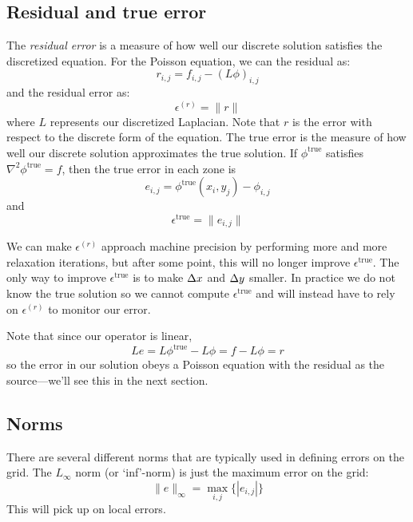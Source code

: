 \subsection{Residual and true error}

The {\em residual error} is a measure of how well our discrete solution
satisfies the discretized equation.  For the Poisson equation, we
can the residual as:
\begin{equation}
r_{i,j} = f_{i,j} - (L \phi)_{i,j} 
\end{equation}
and the residual error as:
\begin{equation}
\epsilon^{(r)} = \| r \|
\end{equation}
where $L$ represents our discretized Laplacian.  Note that $r$ is the
error with respect to the discrete form of the equation.  The true
error is the measure of how well our discrete solution approximates
the true solution.  If $\phi^\mathrm{true}$ satisfies $\nabla^2
\phi^\mathrm{true} = f$, then the true error in each zone is
\begin{equation}
e_{i,j} = \phi^\mathrm{true}(x_i,y_j) - \phi_{i,j} 
\end{equation}
and
\begin{equation}
\epsilon^\mathrm{true} = \| e_{i,j} \|
\end{equation}

We can make $\epsilon^{(r)}$ approach machine precision by performing
more and more relaxation iterations, but after some point, this will
no longer improve $\epsilon^\mathrm{true}$.  The only way to improve
$\epsilon^\mathrm{true}$ is to make $\Delta x$ and $\Delta y$ smaller.
In practice we do not know the true solution so we cannot compute
$\epsilon^\mathrm{true}$ and will instead have to rely on
$\epsilon^{(r)}$ to monitor our error.

Note that since our operator is linear,
\begin{equation}
L e = L\phi^\mathrm{true} - L\phi = f - L\phi = r
\end{equation}
so the error in our solution obeys a Poisson equation with the residual
as the source---we'll see this in the next section.

\subsection{Norms}

There are several different norms that are typically used in defining
errors on the grid.  The $L_\infty$ norm (or `inf'-norm) is just the
maximum error on the grid:
\begin{equation}
\|e\|_\infty = \max_{i,j} \{ |e_{i,j}| \}
\end{equation}
This will pick up on local errors.  

